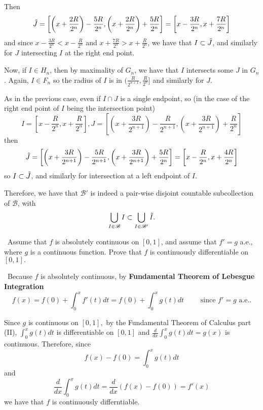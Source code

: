\documentclass[12pt]{Homework}
\begin{document}
\begin{solution}
Then $$\Tilde{J}=\left[\left(x+\frac{2R}{2^n}\right)-\frac{5R}{2^n},\left(x+\frac{2R}{2^n}\right)+\frac{5R}{2^n}\right]=\left[x-\frac{3R}{2^n},x+\frac{7R}{2^n}\right]$$ and since $x-\frac{3R}{2^n}<x-\frac{R}{2^n}$ and $x+\frac{7R}{2^n}>x+\frac{R}{2^n}$, we have that $I\subset\Tilde{J}$, and similarly for $J$ intersecting $I$ at the right end point.

Now, if $I\in H_n$, then by maximality of $G_n$, we have that $I$ intersects some $J$ in $G_n$. Again, $I\in F_n$ so the radius of $I$ is in $(\frac{R}{2^{n+1}},\frac{R}{2^n}]$ and similarly for $J$.

As in the previous case, even if $I\cap J$ is a single endpoint, so (in the case of the right end point of $I$ being the intersection point) $$I=\left[x-\frac{R}{2^n},x+\frac{R}{2^n}\right], J=\left[\left(x+\frac{3R}{2^{n+1}}\right)-\frac{R}{2^{n+1}},\left(x+\frac{3R}{2^{n+1}}\right)+\frac{R}{2^n}\right]$$ then $$\Tilde{J}=\left[\left(x+\frac{3R}{2^{n+1}}\right)-\frac{5R}{2^{n+1}},\left(x+\frac{3R}{2^{n+1}}\right)+\frac{5R}{2^n}\right]=\left[x-\frac{R}{2^n},x+\frac{4R}{2^n}\right]$$ so $I\subset\Tilde{J}$, and similarly for intersection at a left endpoint of $I.$

Therefore, we have that $\mathscr{B}'$ is indeed a pair-wise disjoint countable subcollection of $\mathscr{B}$, with $$\bigcup_{I\in\mathscr{B}}I\subset\bigcup_{I\in\mathscr{B}'}\Tilde{I}.$$ 

\end{solution}
\newpage



\begin{problem} $\,$
Assume that $f$ is absolutely continuous on $[0,1]$, and assume that $f'=g$ a.e., where $g$ is a continuous function. Prove that $f$ is continuously differentiable on $[0,1].$
\end{problem}


\begin{solution}$\,$
Because $f$ is absolutely continuous, by \textbf{Fundamental Theorem of Lebesgue Integration} $$f(x)=f(0)+\int_0^xf'(t)dt=f(0)+\int_0^xg(t)dt\qquad\text{ since }f'=g\text{ a.e.}.$$

Since $g$ is continuous on $[0,1],$ by the Fundamental Theorem of Calculus part (II), $\displaystyle \int_0^xg(t)dt$ is differentiable on $[0,1]$ and $\displaystyle \frac{d}{dx}\int_0^xg(t)dt=g(x)$ is continuous. Therefore, since $$f(x)-f(0)=\int_0^xg(t)dt$$ and $$\frac{d}{dx}\int_0^xg(t)dt=\frac{d}{dx}(f(x)-f(0))=f'(x)$$ we have that $f$ is continuously differntiable.   
\end{solution}
\newpage
\end{document}
